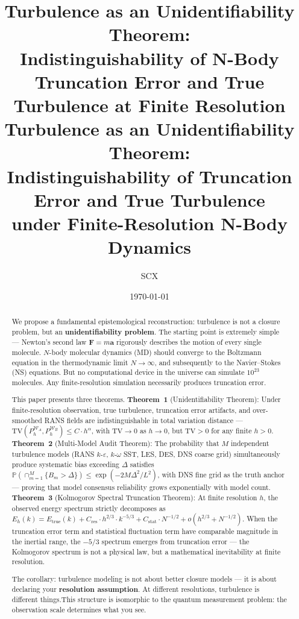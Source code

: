 \documentclass[11pt,a4paper]{article}
\title{\bfseries Turbulence as an Unidentifiability Theorem:\\
Indistinguishability of N-Body Truncation Error and True Turbulence at Finite Resolution\\
\normalsize Turbulence as an Unidentifiability Theorem: \\
Indistinguishability of Truncation Error and True Turbulence \\
under Finite-Resolution N-Body Dynamics}
\author{SCX}
\date{\today}
\theoremstyle{definition}
\theoremstyle{remark}
\newcommand{\TV}{\mathrm{TV}}
\begin{document}
\maketitle

\begin{abstract}
We propose a fundamental epistemological reconstruction: turbulence is not a closure problem, but an \textbf{unidentifiability problem}.
The starting point is extremely simple --- Newton's second law $\bm{F}=m\bm{a}$ rigorously describes the motion of every single molecule. $N$-body molecular dynamics (MD) should converge to the Boltzmann equation in the thermodynamic limit $N\to\infty$, and subsequently to the Navier--Stokes (NS) equations. But no computational device in the universe can simulate $10^{23}$ molecules. Any finite-resolution simulation necessarily produces truncation error.

This paper presents three theorems. \textbf{Theorem~1} (Unidentifiability Theorem): Under finite-resolution observation, true turbulence, truncation error artifacts, and over-smoothed RANS fields are indistinguishable in total variation distance --- $\TV(P_h^{\mathcal{W}_A}, P_h^{\mathcal{W}_B}) \leq C\cdot h^{\alpha}$, with $\TV\to 0$ as $h\to 0$, but $\TV>0$ for any finite $h>0$. \textbf{Theorem~2} (Multi-Model Audit Theorem): The probability that $M$ independent turbulence models (RANS $k$-$\varepsilon$, $k$-$\omega$ SST, LES, DES, DNS coarse grid) simultaneously produce systematic bias exceeding $\Delta$ satisfies $\mathbb{P}(\cap_{m=1}^{M}\{B_m > \Delta\}) \leq \exp(-2M\Delta^2/L^2)$, with DNS fine grid as the truth anchor --- proving that model consensus reliability grows exponentially with model count. \textbf{Theorem~3} (Kolmogorov Spectral Truncation Theorem): At finite resolution $h$, the observed energy spectrum strictly decomposes as $E_h(k) = E_{\text{true}}(k) + C_{\text{res}}\cdot h^{2/3}\cdot k^{-5/3} + C_{\text{stat}}\cdot N^{-1/2} + o(h^{2/3} + N^{-1/2})$. When the truncation error term and statistical fluctuation term have comparable magnitude in the inertial range, the $-5/3$ spectrum emerges from truncation error --- the Kolmogorov spectrum is not a physical law, but a mathematical inevitability at finite resolution.

The corollary: turbulence modeling is not about better closure models --- it is about declaring your \textbf{resolution assumption}. At different resolutions, turbulence is different things.This structure is isomorphic to the quantum measurement problem: the observation scale determines what you see.
\end{abstract}
\end{document}
